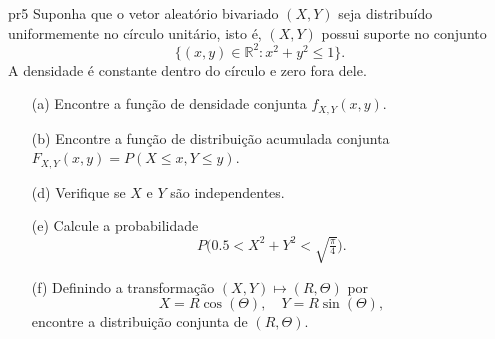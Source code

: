 \begin{problema}{}{pr5}
Suponha que o vetor aleatório bivariado $(X,Y)$ seja distribuído uniformemente no círculo unitário, isto é, $(X,Y)$ possui suporte no conjunto 
\[
\{(x,y) \in \mathbb{R}^2 : x^2 + y^2 \leq 1 \}.
\]
A densidade é constante dentro do círculo e zero fora dele.


\begin{enumerate}
	\item[(a)] Encontre a função de densidade conjunta $f_{X,Y}(x,y)$.
	\item[(b)] Encontre a função de distribuição acumulada conjunta $F_{X,Y}(x,y) = P(X \leq x, Y \leq y)$.
	\item[(d)] Verifique se $X$ e $Y$ são independentes. 
	\item[(e)] Calcule a probabilidade 
	\[
	P\bigl(0.5 < X^2 + Y^2 < \sqrt{\tfrac{\pi}{4}}\bigr).
	\]
	\item[(f)] Definindo a transformação $(X,Y) \mapsto (R,\Theta)$ por
	\[
	X = R\cos(\Theta), \quad Y = R\sin(\Theta),
	\]
	encontre a distribuição conjunta de $(R,\Theta)$.
	\end{enumerate}
\end{problema}

\bigskip
\centering {\scshape\bf\textcolor{darkred}{BOA PROVA}}

%




